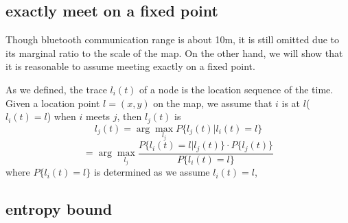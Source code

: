 \subsection{exactly meet on a fixed point}
Though bluetooth communication range is about 10m, it is still omitted due to its marginal ratio to the scale of the map.
On the other hand, we will show that it is reasonable to assume meeting exactly on a fixed point.

As we defined, the trace $l_i(t)$ of a node is the location sequence of the time. Given a location point $l=(x,y)$ on the map, we assume that $i$ is at $l$($l_i(t)=l$) when $i$ meets $j$, then $l_j(t)$ is
\[l_j(t)  =  \arg\max_{l_j} P\{l_j(t)|l_i(t)=l\}\]
\[ = \arg\max_{l_j} \frac{P\{l_i(t) = l|l_j(t)\}\cdot P\{l_j(t)\}}{P\{l_i(t)=l\}}\]
where $P\{l_i(t)=l\}$ is determined as we assume $l_i(t)=l$, 

 
\subsection{entropy bound}
